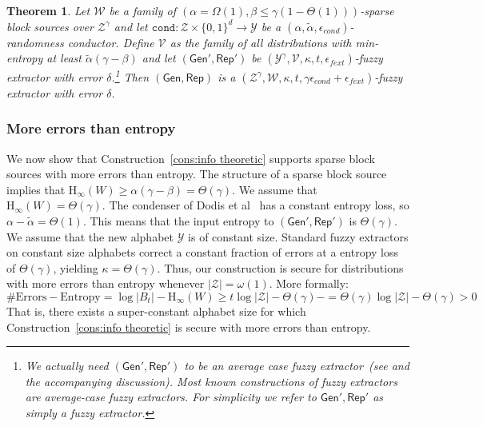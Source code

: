 \documentclass[11pt]{article}
\newtheorem{theorem}{Theorem}[section]
\renewcommand{\paragraph}[1]{\subsubsection{#1}}
\newcommand{\consref}[1]{\mbox{Construction~\ref{#1}}}
\newcommand{\class}[1]{{\ensuremath{\mathsf{#1}}}}
\newcommand{\gen}{\ensuremath{\class{Gen}}\xspace}
\newcommand{\rep}{\ensuremath{\class{Rep}}\xspace}
\newcommand{\zo}{\ensuremath{\{0, 1\}}}
\newcommand{\Hoo}{\mathrm{H}_\infty}
\newcommand{\cond}{\ensuremath{\mathtt{cond}}}
\begin{document}
\begin{theorem}
\label{thm:info theory sec}
Let $\mathcal{W}$ be a family of $(\alpha = \Omega(1), \beta\leq \gamma(1-\Theta(1)))$-sparse block sources over $\mathcal{Z}^\gamma$ and let $\cond: \mathcal{Z} \times \zo^d\rightarrow \mathcal{Y}$ be a $(\alpha, \tilde{\alpha}, \epsilon_{cond})$-randomness conductor.  Define $\mathcal{V}$ as the family of all distributions with min-entropy at least $\tilde{\alpha}(\gamma-\beta)$ and let $(\gen', \rep')$ be $(\mathcal{Y}^\gamma, \mathcal{V}, \kappa, t, \epsilon_{fext})$-fuzzy extractor with error $\delta$.\footnote{We actually need $(\gen', \rep')$ to be an average case fuzzy extractor~(see \cite[Definition 4]{DBLP:journals/siamcomp/DodisORS08} and the accompanying discussion).  Most known constructions of fuzzy extractors are average-case fuzzy extractors.  For simplicity we refer to $\gen', \rep'$ as simply a fuzzy extractor.}  Then $(\gen, \rep)$ is a $(\mathcal{Z}^\gamma, \mathcal{W}, \kappa, t, \gamma\epsilon_{cond}+\epsilon_{fext})$-fuzzy extractor with error $\delta$.
\end{theorem}

\paragraph{More errors than entropy}

We now show that \consref{cons:info theoretic} supports sparse block sources with more errors than entropy.  The structure of a sparse block source implies that  $\Hoo(W) \ge \alpha (\gamma-\beta ) = \Theta(\gamma)$.  We assume that $\Hoo(W) = \Theta(\gamma)$. The condenser of Dodis et al~\cite{dodis2014key} has a constant entropy loss, so $\alpha-\tilde{\alpha} = \Theta(1)$. This means that the input entropy to $(\gen', \rep')$ is $\Theta(\gamma)$.   We assume that the new alphabet $\mathcal{Y}$ is of constant size.  Standard fuzzy extractors on constant size alphabets correct a constant fraction of errors at a entropy loss of $\Theta(\gamma)$, yielding $\kappa = \Theta(\gamma)$.  Thus, our construction is secure for distributions with more errors than entropy whenever $|\mathcal{Z}| = \omega(1)$.
More formally:
\[
\text{\# Errors} - \text{Entropy} = \log |B_t| - \Hoo(W) \ge  t \log |\mathcal{Z}| - \Theta(\gamma)-= \Theta(\gamma) \log |\mathcal{Z}| - \Theta(\gamma)  > 0
\]
That is, there exists a super-constant alphabet size for which \consref{cons:info theoretic} is secure with more errors than entropy.
\end{document}
